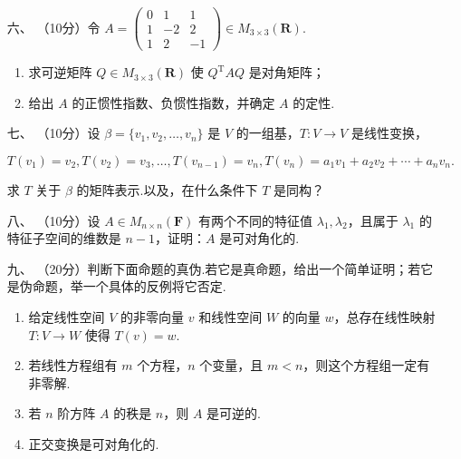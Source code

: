 \begin{enumerate}
\begin{enumerate}[label=(\arabic*)]
    \end{enumerate}
    \item[六、]（10分）令 $A = \begin{pmatrix}0 & 1 & 1 \\ 1 & -2 & 2 \\ 1 & 2 & -1 \end{pmatrix} \in M_{3\times 3}(\mathbf R).$
    \begin{enumerate}[label=(\arabic*)]
        \item 求可逆矩阵 $Q\in M_{3\times 3}(\mathbf R)$ 使 $Q^{\mathrm{T}}AQ$ 是对角矩阵；
        \item 给出 $A$ 的正惯性指数、负惯性指数，并确定 $A$ 的定性.
    \end{enumerate}
    \item[七、]（10分）设 $\beta=\{v_1,v_2,\ldots,v_n\}$ 是 $V$ 的一组基，$T:V\to V$ 是线性变换，

    $T(v_1)=v_2,T(v_2)=v_3,\ldots,T(v_{n-1})=v_n,T(v_n)=a_1v_1+a_2v_2+\cdots+a_nv_n.$

    求 $T$ 关于 $\beta$ 的矩阵表示.以及，在什么条件下 $T$ 是同构？
    \item[八、]（10分）设 $A\in M_{n\times n}(\mathbf{F})$ 有两个不同的特征值 $\lambda_1,\lambda_2$，且属于 $\lambda_1$ 的特征子空间的维数是
    $n-1$，证明：$A$ 是可对角化的.
    \item[九、]（20分）判断下面命题的真伪.若它是真命题，给出一个简单证明；若它是伪命题，举一个具体的反例将它否定.
    \begin{enumerate}[label=(\arabic*)]
        \item 给定线性空间 $V$ 的非零向量 $v$ 和线性空间 $W$ 的向量 $w$，总存在线性映射 $T:V\to W$ 使得 $T(v)=w.$
        \item 若线性方程组有 $m$ 个方程，$n$ 个变量，且 $m < n$，则这个方程组一定有非零解.
        \item 若 $n$ 阶方阵 $A$ 的秩是 $n$，则 $A$ 是可逆的.
        \item 正交变换是可对角化的.
    \end{enumerate}
\end{enumerate}

\clearpage
